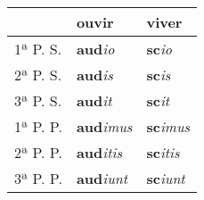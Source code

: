 \documentclass{book}
\newcommand{\radicaldesinencia}[2]{\textbf{#1}\textit{#2}}
\begin{document}
\begin{table}
\centering
\begin{tabular}{l|l|l}
\hline
 & ouvir & viver \\
 \hline
1ª P. S.	&  \radicaldesinencia{aud}{io}		& \radicaldesinencia{sc}{io}		 \\
2ª P. S.	&  \radicaldesinencia{aud}{is} 	& \radicaldesinencia{sc}{is}		 \\
3ª P. S.	&  \radicaldesinencia{aud}{it} 	& \radicaldesinencia{sc}{it}		 \\
\hline
\hline
1ª P. P.	&  \radicaldesinencia{aud}{imus} 	& \radicaldesinencia{sc}{imus}	 \\
2ª P. P. 	&  \radicaldesinencia{aud}{itis} 	& \radicaldesinencia{sc}{itis} 	 \\
3ª P. P.	&  \radicaldesinencia{aud}{iunt} 	& \radicaldesinencia{sc}{iunt}	 \\ 
\hline
\end{tabular}
\end{table}
\clearpage
\end{document}
